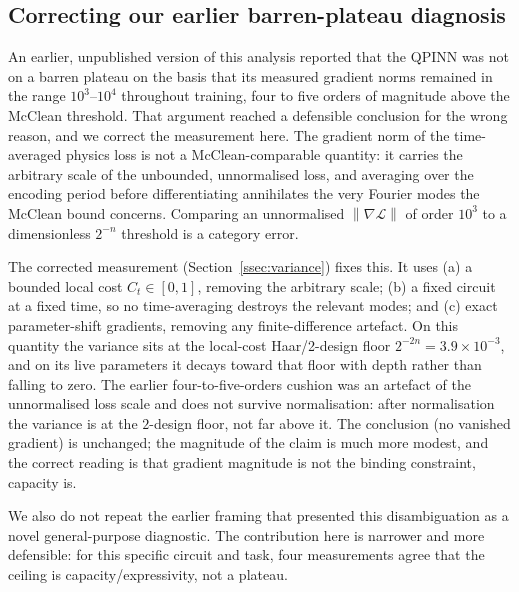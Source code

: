 \documentclass[a4paper,12pt]{iopart}
\providecommand{\norm}[1]{\left\lVert#1\right\rVert}
\begin{document}
\subsection{Correcting our earlier barren-plateau diagnosis}
\label{ssec:walkback}

An earlier, unpublished version of this analysis reported that the QPINN was not
on a barren plateau on the basis that its measured gradient norms remained in the
range $10^{3}$--$10^{4}$ throughout training, four to five orders of magnitude
above the McClean threshold. That argument reached a defensible conclusion for
the wrong reason, and we correct the measurement here. The gradient norm of the
time-averaged physics loss is not a McClean-comparable quantity: it carries the
arbitrary scale of the unbounded, unnormalised loss, and averaging over the
encoding period before differentiating annihilates the very Fourier modes the
McClean bound concerns. Comparing an unnormalised
$\norm{\nabla\mathcal{L}}$ of order $10^{3}$ to a dimensionless $2^{-n}$
threshold is a category error.

The corrected measurement (Section~\ref{ssec:variance}) fixes this. It uses (a) a
bounded local cost $C_t\in[0,1]$, removing the arbitrary scale; (b) a fixed
circuit at a fixed time, so no time-averaging destroys the relevant modes; and
(c) exact parameter-shift gradients, removing any finite-difference artefact. On
this quantity the variance sits at the local-cost Haar/2-design floor
$2^{-2n}=3.9\times10^{-3}$, and on its live parameters it decays toward that
floor with depth rather than falling to zero. The earlier four-to-five-orders
cushion was an artefact of the unnormalised loss scale and does not survive
normalisation: after normalisation the variance is at the $2$-design floor, not
far above it. The conclusion (no vanished gradient) is unchanged; the magnitude
of the claim is much more modest, and the correct reading is that gradient
magnitude is not the binding constraint, capacity is.

We also do not repeat the earlier framing that presented this disambiguation as a
novel general-purpose diagnostic. The contribution here is narrower and more
defensible: for this specific circuit and task, four measurements agree that the
ceiling is capacity/expressivity, not a plateau.

\end{document}
